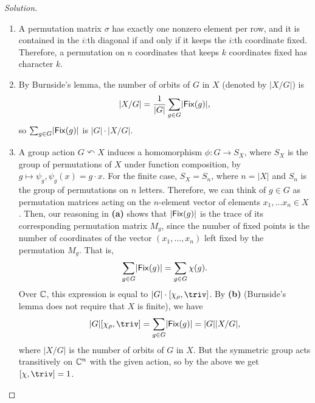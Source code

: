 \begin{proof}[Solution]
\hfill
\begin{enumerate}[font=\normalfont,label=\textbf{(\alph*)}, wide]
\item A permutation matrix $\sigma$ has exactly one nonzero element per row, and it is contained in the $i$:th diagonal if and only if it keeps the $i$:th coordinate fixed. Therefore, a permutation on $n$ coordinates that keeps $k$ coordinates fixed has character $k$.

\item By Burnside's lemma, the number of orbits of $G$ in $X$ (denoted by $\lvert X/G \rvert$) is
\[
\lvert X/G\rvert = \frac{1}{\lvert G \rvert}\sum_{g\in G} \lvert \mathsf{Fix}(g)\rvert,
\]
so $\sum_{g \in G}\lvert \mathsf{Fix}(g)\rvert$ is $\lvert G\rvert \cdot \lvert X/G\rvert$.
\item A group action $G \curvearrowleft X$ induces a homomorphism $\phi: G \to S_X$, where $S_X$ is the group of permutations of $X$ under function composition, by $g \mapsto \psi_g, \psi_g(x) = g \cdot x$. For the finite case, $S_X = S_n$, where $n = \lvert X \rvert$ and $S_n$ is the group of permutations on $n$ letters. Therefore, we can think of $g \in G$ as permutation matrices acting on the $n$-element vector of elements $x_1, \ldots x_n  \in X$. Then, our reasoning in \textbf{(a)} shows that $\lvert \mathsf{Fix}(g) \rvert$ is the trace of its corresponding permutation matrix $M_g$, since the number of fixed points is the number of coordinates of the vector $(x_1, \ldots, x_n)$ left fixed by the permutation $M_g$. That is,
\[
\sum_{g \in G}\lvert \mathsf{Fix}(g) \rvert = \sum_{g\in G} \chi(g).
\]
Over $\mathbb{C}$, this expression is equal to $\lvert G\rvert \cdot [\chi_\rho, \triv]$. By \textbf{(b)} (Burnside's lemma does not require that $X$ is finite), we have
\[
 \lvert G \rvert[\chi_\rho, \triv] = \sum_{g \in G}\lvert \Fix(g)\rvert = \lvert G\rvert \lvert X/G\rvert,
\]
where $\lvert X/G\rvert$ is the number of orbits of $G$ in $X$. But the symmetric group acts transitively on $\mathbb{C}^n$ with the given action, so by the above we get $[\chi, \triv] = 1$.
\end{enumerate}
\end{proof}

\newpage



